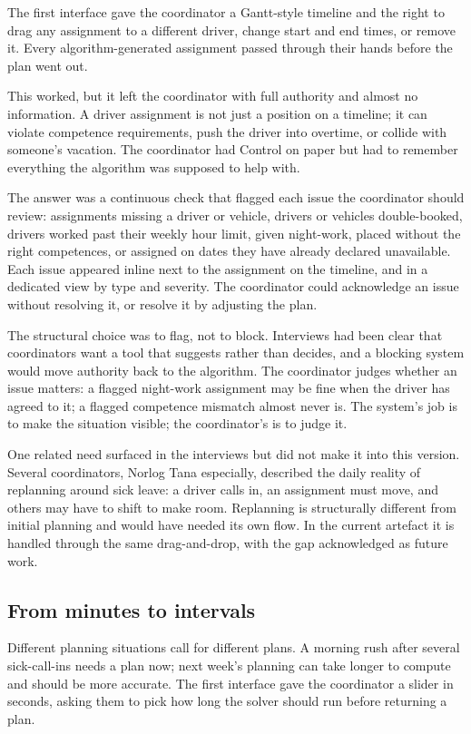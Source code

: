The first interface gave the coordinator a Gantt-style timeline and the right to drag any assignment to a different driver, change start and end times, or remove it. Every algorithm-generated assignment passed through their hands before the plan went out.

This worked, but it left the coordinator with full authority and almost no information. A driver assignment is not just a position on a timeline; it can violate competence requirements, push the driver into overtime, or collide with someone's vacation. The coordinator had Control on paper but had to remember everything the algorithm was supposed to help with.

The answer was a continuous check that flagged each issue the coordinator should review: assignments missing a driver or vehicle, drivers or vehicles double-booked, drivers worked past their weekly hour limit, given night-work, placed without the right competences, or assigned on dates they have already declared unavailable. Each issue appeared inline next to the assignment on the timeline, and in a dedicated view by type and severity. The coordinator could acknowledge an issue without resolving it, or resolve it by adjusting the plan.

The structural choice was to flag, not to block. Interviews had been clear that coordinators want a tool that suggests rather than decides, and a blocking system would move authority back to the algorithm. The coordinator judges whether an issue matters: a flagged night-work assignment may be fine when the driver has agreed to it; a flagged competence mismatch almost never is. The system's job is to make the situation visible; the coordinator's is to judge it.

One related need surfaced in the interviews but did not make it into this version. Several coordinators, Norlog Tana especially, described the daily reality of replanning around sick leave: a driver calls in, an assignment must move, and others may have to shift to make room. Replanning is structurally different from initial planning and would have needed its own flow. In the current artefact it is handled through the same drag-and-drop, with the gap acknowledged as future work.

\subsection{From minutes to intervals}
\label{sec:plan-time-intervals}

Different planning situations call for different plans. A morning rush after several sick-call-ins needs a plan now; next week's planning can take longer to compute and should be more accurate. The first interface gave the coordinator a slider in seconds, asking them to pick how long the solver should run before returning a plan.

